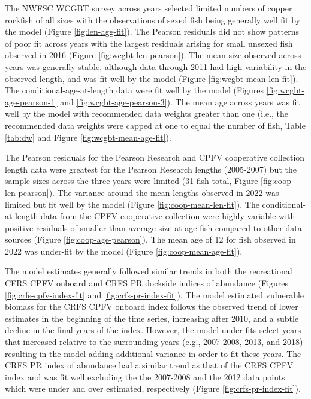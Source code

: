 \documentclass[11pt,
  english,
  letterpaper,
]{article}
\begin{document}
The NWFSC WCGBT survey across years selected limited numbers of copper rockfish of all sizes with the observations of sexed fish being generally well fit by the model (Figure \ref{fig:len-agg-fit}). The Pearson residuals did not show patterns of poor fit across years with the largest residuals arising for small unsexed fish observed in 2016 (Figure \ref{fig:wcgbt-len-pearson}). The mean size observed across years was generally stable, although data through 2011 had high variability in the observed length, and was fit well by the model (Figure \ref{fig:wcgbt-mean-len-fit}). The conditional-age-at-length data were fit well by the model (Figures \ref{fig:wcgbt-age-pearson-1} and \ref{fig:wcgbt-age-pearson-3}). The mean age across years was fit well by the model with recommended data weights greater than one (i.e., the recommended data weights were capped at one to equal the number of fish, Table \ref{tab:dw} and Figure \ref{fig:wcgbt-mean-age-fit}).

The Pearson residuals for the Pearson Research and CPFV cooperative collection length data were greatest for the Pearson Research lengths (2005-2007) but the sample sizes across the three years were limited (31 fish total, Figure \ref{fig:coop-len-pearson}). The variance around the mean lengths observed in 2022 was limited but fit well by the model (Figure \ref{fig:coop-mean-len-fit}). The conditional-at-length data from the CPFV cooperative collection were highly variable with positive residuals of smaller than average size-at-age fish compared to other data sources (Figure \ref{fig:coop-age-pearson}). The mean age of 12 for fish observed in 2022 was under-fit by the model (Figure \ref{fig:coop-mean-age-fit}).

The model estimates generally followed similar trends in both the recreational CFRS CPFV onboard and CRFS PR dockside indices of abundance (Figures \ref{fig:crfs-cpfv-index-fit} and \ref{fig:crfs-pr-index-fit}). The model estimated vulnerable biomass for the CRFS CPFV onboard index follows the observed trend of lower estimates in the beginning of the time series, increasing after 2010, and a subtle decline in the final years of the index. However, the model under-fits select years that increased relative to the surrounding years (e.g., 2007-2008, 2013, and 2018) resulting in the model adding additional variance in order to fit these years. The CRFS PR index of abundance had a similar trend as that of the CRFS CPFV index and was fit well excluding the the 2007-2008 and the 2012 data points which were under and over estimated, respectively (Figure \ref{fig:crfs-pr-index-fit}).
\end{document}
